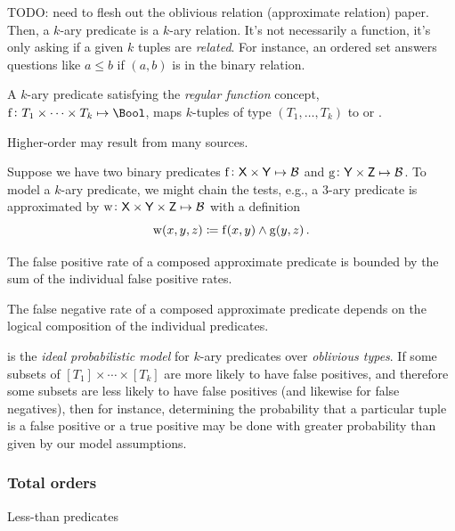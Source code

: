 \documentclass[11pt,final,hidelinks]{article}
\begin{document}
TODO: need to flesh out the oblivious relation (approximate relation) paper.
Then, a $k$-ary predicate is a $k$-ary relation. It's not necessarily a function, it's only asking if a given $k$ tuples are \emph{related}. For instance, an ordered set answers questions like $a \leq b$ if $(a,b)$ is in the binary relation.

A $k$-ary predicate satisfying the \emph{regular function} concept, $\Fun{f} \colon T_1 \times \cdots \times T_k \mapsto \Bool$, maps $k$-tuples of type $(T_1,\ldots,T_k)$ to \True or \False.




Higher-order may result from many sources.

Suppose we have two binary predicates $\Fun{f} \colon \Set{X} \times \Set{Y} \mapsto \BitSet$ and $\Fun{g} \colon \Set{Y} \times \Set{Z} \mapsto \BitSet$.
To model a $k$-ary predicate, we might chain the tests, e.g., a $3$-ary predicate is approximated by $\Fun{w} \colon \Set{X} \times \Set{Y} \times \Set{Z} \mapsto \BitSet$ with a definition
\begin{equation}
	\Fun{w}(x,y,z) \coloneqq \Fun{f}(x,y) \land \Fun{g}(y,z)\,.
\end{equation}

\begin{theorem}
\label{thm:fpr}
The false positive rate of a composed approximate predicate is bounded by the sum of the individual false positive rates.
\end{theorem}

\begin{theorem}
\label{thm:fnr}
The false negative rate of a composed approximate predicate depends on the logical composition of the individual predicates.
\end{theorem}

 is the \emph{ideal probabilistic model} for $k$-ary predicates over \emph{oblivious types}.
If some subsets of $[T_1] \times \cdots \times [T_k]$ are more likely to have false positives, and therefore some subsets are less likely to have false positives (and likewise for false negatives), then for instance, determining the probability that a particular tuple is a false positive or a true positive may be done with greater probability than given by our model assumptions.

\subsubsection{Total orders}
Less-than predicates
\end{document}
